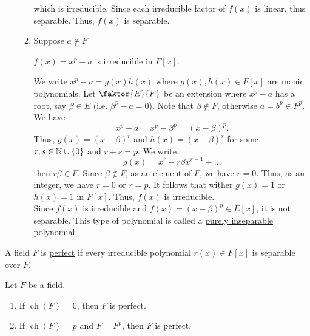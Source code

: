 \documentclass[11pt]{article}
\newcommand{\quotient}[2]{\faktor{#1}{#2}}
\DeclareMathOperator{\ch}{ch}
\begin{document}
\begin{example}
\begin{enumerate}
\begin{enumerate}
\begin{equation*}
\end{equation*}
which is irreducible. Since each irreducible factor of $f(x)$ is linear, thus
separable. Thus, $f(x)$ is separable.
\item Suppose $a \not\in F$
\begin{claim}
$f(x) = x^p -a$ is irreducible in $F[x]$.
\end{claim}
We write $x^p - a = g(x)h(x)$ where $g(x),h(x) \in F[x]$ are monic polynomials.
Let $\quotient{E}{F}$ be an extension where $x^p - a$ has a root, say $\beta \in
E$ (i.e. $\beta^p - a = 0$). Note that $\beta \not\in F$, otherwise $a = b^p \in
F^p$. We have
\begin{equation*}
x^p -a = x^p - \beta^p = (x - \beta)^p. \tag{by Binomial Theorem}
\end{equation*}
Thus, $g(x) = (x - \beta)^r$ and $h(x) = (x - \beta)^s$ for some $r,s \in \mathbb{N}
\cup \{0\}$ and $r+s = p$. We write,
\begin{equation*}
g(x) = x^r - r\beta x^{r-1} + \dots
\end{equation*}
then $r\beta \in F$. Since $\beta \not\in F$, as an element of $F$, we have $r =
0$. Thus, as an integer, we have $r = 0$ or $r = p$. It follows that wither
$g(x) = 1$ or $h(x) = 1$ in $F[x]$. Thus, $f(x)$ is irreducible.\\

Since $f(x)$ is irreducible and $f(x) = (x-\beta)^p \in E[x]$, it is not
separable. This type of polynomial is called a \underline{purely inseparable
polynomial}.
\end{enumerate}
\end{enumerate}
\end{example}
\begin{definition}
A field $F$ is \underline{perfect} if every irreducible polynomial $r(x) \in
F[x]$ is separable over $F$.
\end{definition}
\begin{theorem}
Let $F$ be a field.
\begin{enumerate}
\item If $\ch(F) = 0$, then $F$ is perfect.
\item If $\ch(F) = p$ and $F = F^p$, then $F$ is perfect.
\end{enumerate}
\label{theorem26}
\end{theorem}
\end{document}
